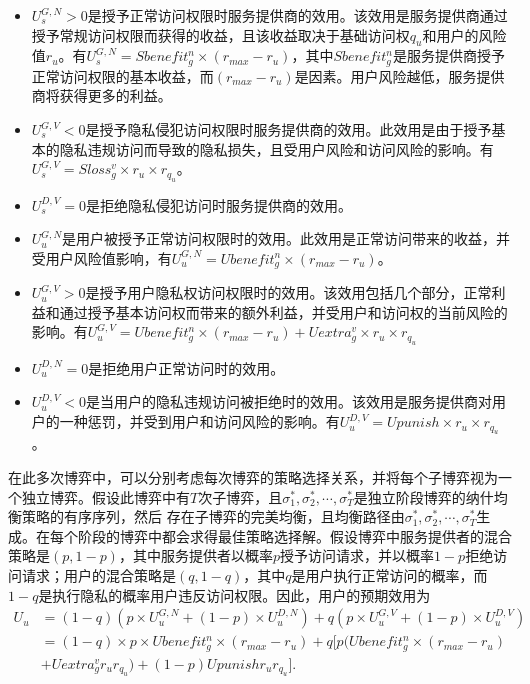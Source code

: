 \begin{itemize}
	\item $U_s^{G,N} >0$是授予正常访问权限时服务提供商的效用。该效用是服务提供商通过授予常规访问权限而获得的收益，且该收益取决于基础访问权$q_u$和用户的风险值$r_u$。有$U_s^{G,N}= Sbenefit_g^n\times (r_{max}-r_u)$​​，其中$Sbenefit_g^n$是服务提供商授予正常访问权限的基本收益，而$(r_{max}-r_u)$​​是因素。用户风险越低，服务提供商将获得更多的利益。
	\item $U_s^{G,V}<0$是授予隐私侵犯访问权限时服务提供商的效用。此效用是由于授予基本的隐私违规访问而导致的隐私损失，且受用户风险和访问风险的影响。有$U_s^{G,V}= Sloss_g^v \times r_u \times r_{q_u}$。
	\item $U_s^{D,V} = 0$是拒绝隐私侵犯访问时服务提供商的效用。
	\item $U_u^{G,N}$是用户被授予正常访问权限时的效用。此效用是正常访问带来的收益，并受用户风险值影响，有$U_u^{G,N}= Ubenefit_g^n \times(r_{max} - r_u)$。
	\item $U_u^{G,V} >0$是授予用户隐私权访问权限时的效用。该效用包括几个部分，正常利益和通过授予基本访问权而带来的额外利益，并受用户和访问权的当前风险的影响。有$U_u^{G,V}= Ubenefit_g^n\times(r_{max} - r_u) + Uextra_g^v \times r_u\times r_{q_u}$
	\item $U_u^{D,N} =0$是拒绝用户正常访问时的效用。
	\item $U_u^{D,V}<0$是当用户的隐私违规访问被拒绝时的效用。该效用是服务提供商对用户的一种惩罚，并受到用户和访问风险的影响。有$U_u^{D,V}= Upunish \times r_u \times r_{q_u}$。
\end{itemize}

在此多次博弈中，可以分别考虑每次博弈的策略选择关系，并将每个子博弈视为一个独立博弈。假设此博弈中有$T$次子博弈，且$\sigma_1^*, \sigma_2^*, \cdots, \sigma_T^*$是独立阶段博弈的纳什均衡策略的有序序列，然后 存在子博弈的完美均衡，且均衡路径由$\sigma_1^*, \sigma_2^*, \cdots, \sigma_T^*$生成。在每个阶段的博弈中都会求得最佳策略选择解。假设博弈中服务提供者的混合策略是$(p,1-p)$，其中服务提供者以概率$p$授予访问请求，并以概率$1-p$拒绝访问请求；用户的混合策略是$(q,1-q)$，其中{$ q $}是用户执行正常访问的概率，而$1-q$是执行隐私的概率用户违反访问权限。因此，用户的预期效用为
\begin{equation}
\begin{split}
U_u&= (1-q)(p\times U_u^{G,N}+ (1-p)\times U_u^{D,N})+ q(p\times U_u^{G,V}+(1-p)\times U_u^{D,V})\\
&=(1-q)\times p \times Ubenefit_g^n \times(r_{max} - r_u)+ q[p(Ubenefit_g^n\times(r_{max} - r_u) \\
&+ Uextra_g^v r_ur_{q_u})+(1-p)Upunishr_ur_{q_u}].
\end{split}
\end{equation}

